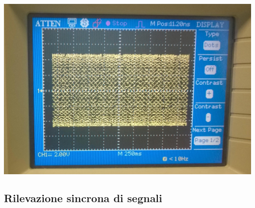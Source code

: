 \documentclass[a4paper]{article}
\begin{document}
\begin{center}
    \includegraphics[scale=0.13]{foto/WP_20141009_021.jpg}
\end{center}

\begin{tcolorbox}[breakable,colback=cyan,colframe=cyan]
\section*{Rilevazione sincrona di segnali}
\end{tcolorbox}
\end{document}
